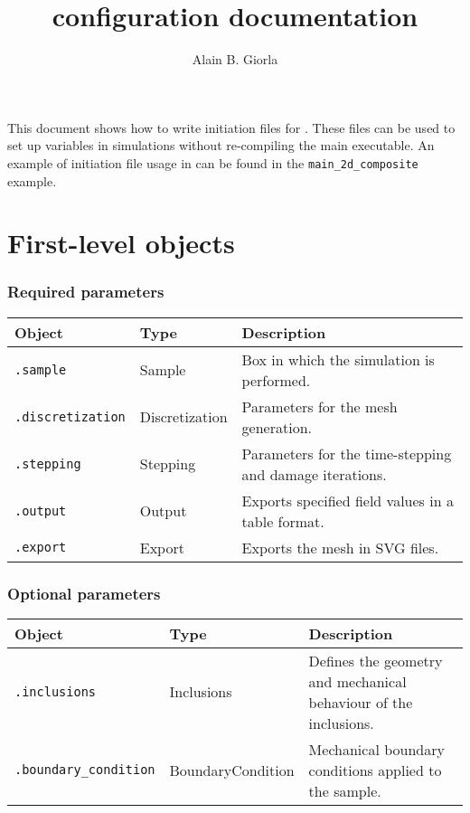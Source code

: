 \documentclass[10pt]{article}
\begin{document}
\title{\amie configuration documentation}
\author{Alain B. Giorla}

\maketitle

This document shows how to write initiation files for \amie. These files can be used to set up variables in simulations without re-compiling the main executable. An example of initiation file usage in \amie can be found in the \verb+main_2d_composite+ example.

\tableofcontents

\section{First-level objects}

\subsubsection*{Required parameters}

\begin{tabularx}{\textwidth}{llX}
\hline 
Object & Type & Description \\ 
\hline 
\verb+.sample+ & Sample & Box in which the simulation is performed. \\ 
\verb+.discretization+ & Discretization & Parameters for the mesh generation. \\ 
\verb+.stepping+ & Stepping & Parameters for the time-stepping and damage iterations. \\ 
\verb+.output+ & Output & Exports specified field values in a table format. \\ 
\verb+.export+ & Export & Exports the mesh in SVG files. \\ 
\hline 
\end{tabularx}

\subsubsection*{Optional parameters}

\begin{tabularx}{\textwidth}{llX}
\hline 
Object & Type & Description \\ 
\hline 
\verb+.inclusions+ & Inclusions & Defines the geometry and mechanical behaviour of the inclusions. \\ 
\verb+.boundary_condition+ & BoundaryCondition & Mechanical boundary conditions applied to the sample. \\ 
\hline 
\end{tabularx} 
\end{document}

